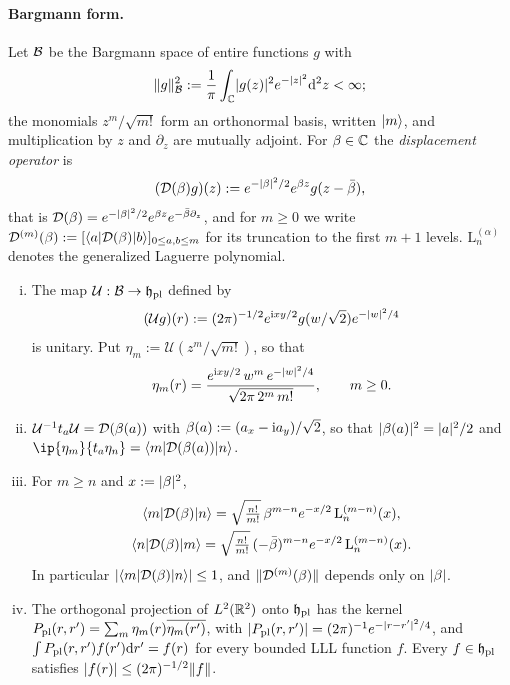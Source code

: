 \paragraph{Bargmann form.}
Let $\mathcal{B}$ be the Bargmann space of entire functions $g$ with
\[
\lVert g\rVert_{\mathcal{B}}^2:=\frac1\pi\int_{\mathbb{C}}\lvert g(z)\rvert^2e^{-\lvert z\rvert^2}\mathrm{d}^2z<\infty ;
\]
the monomials $z^m/\sqrt{m!}$ form an orthonormal basis, written $\lvert m\rangle$, and multiplication by $z$ and $\partial_z$ are
mutually adjoint. For $\beta\in\mathbb{C}$
the \emph{displacement operator} is
\begin{equation}\label{eq:displacement}
(\mathcal{D}(\beta)g)(z):=e^{-\lvert\beta\rvert^2/2}e^{\beta z}g(z-\bar\beta),
\end{equation}
that is $\mathcal{D}(\beta)=e^{-\lvert\beta\rvert^2/2}e^{\beta z}e^{-\bar\beta\partial_z}$, and for $m\ge0$ we write
$\mathcal{D}^{(m)}(\beta):=[\langle a\rvert\mathcal{D}(\beta)\lvert b\rangle]_{0\le a,b\le m}$ for its truncation to the first $m+1$ levels.
$\mathrm L_n^{(\alpha)}$ denotes the generalized Laguerre polynomial.

\begin{lemma}\label{lem:bargmann}
\begin{enumerate}[(i)]
\item The map $\mathcal U:\mathcal{B}\to\mathfrak{h}_{\mathrm{pl}}$ defined by
\[
(\mathcal U g)(r):=(2\pi)^{-1/2}e^{\mathrm{i} xy/2}g(w/\sqrt2)e^{-\lvert w\rvert^2/4}
\]
is unitary. Put $\eta_m:=\mathcal U(z^m/\sqrt{m!})$, so that
\[
\eta_m(r)=\frac{e^{\mathrm{i} xy/2}\,w^m\,e^{-\lvert w\rvert^2/4}}{\sqrt{2\pi\,2^m\,m!}},\qquad m\ge0 .
\]
\item $\mathcal U^{-1}t_a\mathcal U=\mathcal{D}(\beta(a))$ with $\beta(a):=(a_x-\mathrm{i} a_y)/\sqrt2$, so that $\lvert\beta(a)\rvert^2=\lvert a\rvert^2/2$ and
$\ip{\eta_m}{t_a\eta_n}=\bra m\Dis(\beta(a))\ket n$.
\item For $m\ge n$ and $x:=\lvert\beta\rvert^2$,
\begin{gather*}
\langle m\rvert\mathcal{D}(\beta)\lvert n\rangle=\sqrt{\tfrac{n!}{m!}}\,\beta^{m-n}e^{-x/2}\,\mathrm L_n^{(m-n)}(x),\\
\langle n\rvert\mathcal{D}(\beta)\lvert m\rangle=\sqrt{\tfrac{n!}{m!}}\,(-\bar\beta)^{m-n}e^{-x/2}\,\mathrm L_n^{(m-n)}(x).
\end{gather*}
In particular $\lvert\langle m\rvert\mathcal{D}(\beta)\lvert n\rangle\rvert\le1$, and $\lVert\mathcal{D}^{(m)}(\beta)\rVert$ depends only on $\lvert\beta\rvert$.
\item The orthogonal projection of $L^2(\mathbb{R}^2)$ onto $\mathfrak{h}_{\mathrm{pl}}$ has the kernel
$P_{\mathrm{pl}}(r,r')=\sum_m\eta_m(r)\overline{\eta_m(r')}$, with $\lvert P_{\mathrm{pl}}(r,r')\rvert=(2\pi)^{-1}e^{-\lvert r-r'\rvert^2/4}$, and
$\int P_{\mathrm{pl}}(r,r')f(r')\mathrm{d} r'=f(r)$ for every bounded LLL function $f$. Every $f\in\mathfrak{h}_{\mathrm{pl}}$ satisfies
$\lvert f(r)\rvert\le(2\pi)^{-1/2}\lVert f\rVert$.
\end{enumerate}
\end{lemma}

